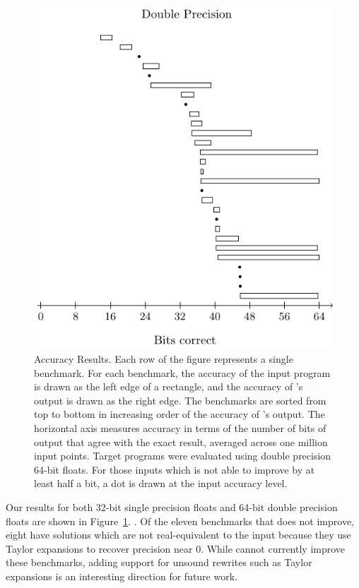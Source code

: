 \documentclass[paper.tex]{subfiles}
\begin{document}
\begin{figure}
  \centering
    \includegraphics[width=0.9\columnwidth]{fig/eval-rect-d.pdf}
    \caption{Accuracy Results. Each row of the figure represents a
      single benchmark. For each benchmark, the accuracy of the input
      program is drawn as the left edge of a rectangle, and the
      accuracy of \casio's output is drawn as the right edge.  The
      benchmarks are sorted from top to bottom in increasing order of
      the accuracy of \casio's output. The horizontal axis measures
      accuracy in terms of the number of bits of output that agree
      with the exact result, averaged across one million input
      points. Target programs were evaluated using double precision
      64-bit floats. For those inputs which \casio is not able to
      improve by at least half a bit, a dot is drawn at the input
      accuracy level. }
  \label{fig:eval-rect}
\end{figure}

 Our results for both 32-bit single precision floats
and 64-bit double precision floats are shown in
Figure~\ref{fig:eval-rect}. . Of
the eleven benchmarks that \casio does not improve, eight have
solutions which are not real-equivalent to the input because they use
Taylor expansions to recover precision near 0. While \casio cannot
currently improve these benchmarks, adding support for unsound
rewrites such as Taylor expansions is an interesting direction for
future work.
\end{document}
